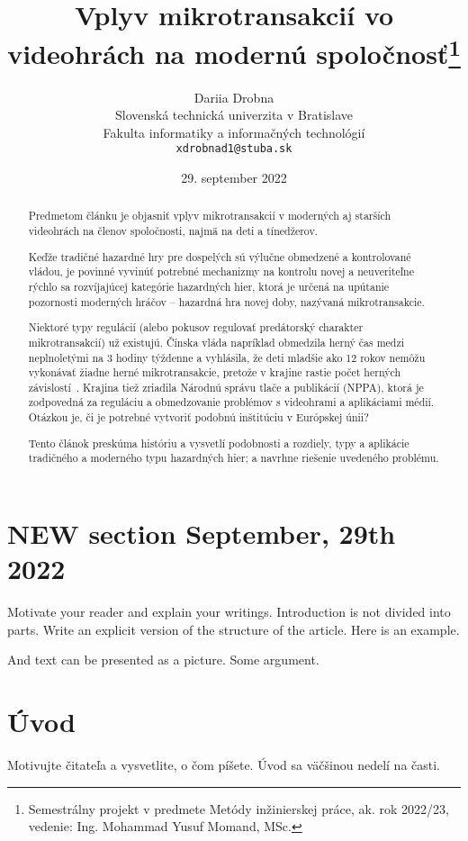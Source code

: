 \documentclass[10pt,twoside,slovak,a4paper]{coursepaper}
\title{Vplyv mikrotransakcií vo videohrách na modernú spoločnosť\thanks{Semestrálny projekt v predmete Metódy inžinierskej práce, ak. rok 2022/23, vedenie: Ing. Mohammad Yusuf Momand, MSc.}}
\author{Dariia Drobna\\[2pt]
	{\small Slovenská technická univerzita v Bratislave}\\
	{\small Fakulta informatiky a informačných technológií}\\
	{\small \texttt{xdrobnad1@stuba.sk}}
	}
\date{\small 29. september 2022}
\begin{document}
\maketitle

\begin{abstract}
Predmetom článku je objasniť vplyv mikrotransakcií v moderných aj starších
videohrách na členov spoločnosti, najmä na deti a tínedžerov.


Keďže tradičné hazardné hry pre dospelých sú výlučne obmedzené a
kontrolované vládou, je povinné vyvinúť potrebné mechanizmy na kontrolu novej a
neuveriteľne rýchlo sa rozvíjajúcej kategórie hazardných hier, ktorá je určená na
upútanie pozornosti moderných hráčov – hazardná hra novej doby, nazývaná
mikrotransakcie.


Niektoré typy regulácií (alebo pokusov regulovať predátorský charakter
mikrotransakcií) už existujú. Čínska vláda napríklad obmedzila herný čas medzi
neplnoletými na 3 hodiny týždenne a vyhlásila, že deti mladšie ako 12 rokov nemôžu
vykonávať žiadne herné mikrotransakcie, pretože v krajine rastie počet herných
závislostí~\cite{shen2021predatory}. Krajina tiež zriadila Národnú správu tlače a publikácií (NPPA), ktorá je
zodpovedná za reguláciu a obmedzovanie problémov s videohrami a aplikáciami
médií. Otázkou je, či je potrebné vytvoriť podobnú inštitúciu v Európskej únii?


Tento článok preskúma históriu a vysvetlí podobnosti a rozdiely, typy a
aplikácie tradičného a moderného typu hazardných hier; a navrhne riešenie uvedeného
problému.
\end{abstract}


\section{NEW section September, 29th 2022}


Motivate your reader and explain your writings. Introduction is not divided into parts. Write an explicit version of the structure of the article. Here is an example. 

And text can be presented as a picture. Some argument. 



\section{Úvod}

Motivujte čitateľa a vysvetlite, o čom píšete. Úvod sa väčšinou nedelí na časti.
\end{document}
